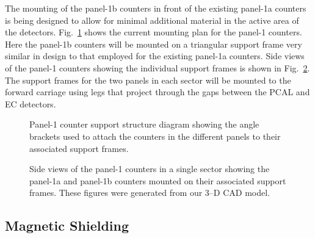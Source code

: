 The mounting of the panel-1b counters in front of the existing panel-1a
counters is being designed to allow for minimal additional material in the
active area of the detectors.  Fig.~\ref{tofsupport1} shows the current 
mounting plan for the panel-1 counters.  Here the panel-1b counters will 
be mounted on a triangular support frame very similar in design to that 
employed for the existing panel-1a counters.  Side views of the panel-1 
counters showing the individual support frames is shown in 
Fig.~\ref{tofsupport2}.  The support frames for the two panels in each 
sector will be mounted to the forward carriage using legs that project 
through the gaps between the PCAL and EC detectors.

\begin{figure}[ht]
\vspace{7.0cm}
\caption{\small{Panel-1 counter support structure diagram showing the
angle brackets used to attach the counters in the different panels to their
associated support frames.}}
\label{tofsupport1}
\end{figure}

\begin{figure}[ht]
\vspace{9.5cm}
\caption{\small{Side views of the panel-1 counters in a single sector 
showing the panel-1a and panel-1b counters mounted on their associated
support frames.  These figures were generated from our 3--D CAD model.}}
\label{tofsupport2}
\end{figure}

\subsection{Magnetic Shielding}

